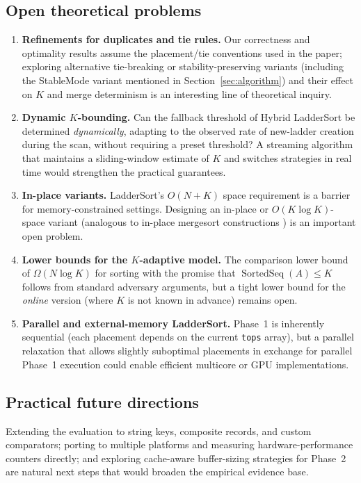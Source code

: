 \documentclass[12pt,a4paper]{article}
\theoremstyle{plain}
\theoremstyle{definition}
\DeclareMathOperator{\SortedSeq}{SortedSeq}
\newcommand{\tops}{\texttt{tops}}
\begin{document}
\subsection{Open theoretical problems}
\begin{enumerate}
  \item \textbf{Refinements for duplicates and tie rules.} Our correctness
    and optimality results assume the placement/tie conventions used in the
    paper; exploring alternative tie-breaking or stability-preserving
    variants (including the StableMode variant mentioned in Section~\ref{sec:algorithm})
    and their effect on $K$ and merge determinism is an interesting line of
    theoretical inquiry.

  \item \textbf{Dynamic $K$-bounding.} Can the fallback threshold of Hybrid
    LadderSort be determined \emph{dynamically}, adapting to the observed
    rate of new-ladder creation during the scan, without requiring a
    preset threshold?  A streaming algorithm that maintains a sliding-window
    estimate of $K$ and switches strategies in real time would strengthen the
    practical guarantees.

  \item \textbf{In-place variants.} LadderSort's $O(N+K)$ space requirement
    is a barrier for memory-constrained settings.  Designing an in-place or
    $O(K\log K)$-space variant (analogous to in-place mergesort
    constructions \cite{Franceschini2004}) is an important open problem.

  \item \textbf{Lower bounds for the $K$-adaptive model.} The comparison
    lower bound of $\Omega(N\log K)$ for sorting with the promise that
    $\SortedSeq(A) \le K$ follows from standard adversary arguments, but a
    tight lower bound for the \emph{online} version (where $K$ is not known in
    advance) remains open.

  \item \textbf{Parallel and external-memory LadderSort.} Phase~1 is
    inherently sequential (each placement depends on the current \tops
    array), but a parallel relaxation that allows slightly suboptimal placements
    in exchange for parallel Phase~1 execution could enable efficient
    multicore or GPU implementations.
\end{enumerate}

\subsection{Practical future directions}
Extending the evaluation to string keys, composite records, and
custom comparators; porting to multiple platforms and measuring
hardware-performance counters directly; and exploring cache-aware
buffer-sizing strategies for Phase~2 are natural next steps that would
broaden the empirical evidence base.
\end{document}
